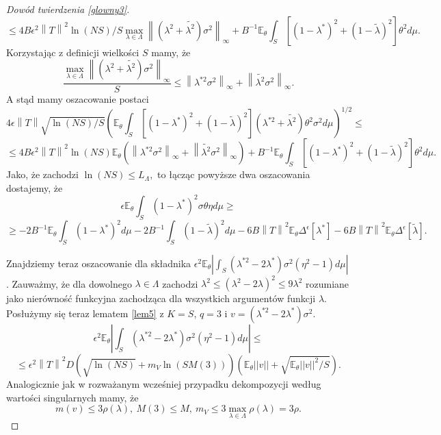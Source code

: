 \documentclass{mwart}
\newcommand{\norm}[1]{\left\lVert#1\right\rVert}
\begin{document}
\begin{proof}[Dowód twierdzenia \ref{glowny3}]
\begin{displaymath}
\leq 4B\epsilon^2\norm{T}^2\ln (NS)/S\max_{\lambda\in \Lambda}\norm{(\lambda^{2}+\tilde{\lambda^2})\sigma^2}_{\infty}+B^{-1}\mathbb{E}_{\theta}\int_S[(1-\lambda^*)^2+(1-\tilde{\lambda})^2]\theta ^2d\mu.
\end{displaymath}
Korzystając z definicji wielkości $S$ mamy, że
\begin{displaymath}
\frac{\max_{\lambda\in \Lambda}\norm{(\lambda^{2}+\tilde{\lambda^2})\sigma^2}_{\infty}}{S}\leq 
\norm{\lambda^{*2}\sigma^2}_{\infty}+\norm{\tilde{\lambda^2}\sigma^2}_{\infty}.
\end{displaymath}
A stąd mamy oszacowanie postaci
\begin{displaymath}
4\epsilon\norm{T}\sqrt{\ln (NS)/S}\left(\mathbb{E}_{\theta}\int_S[(1-\lambda^*)^2+(1-\tilde{\lambda})^2](\lambda^{*2}+\tilde{\lambda^2})\theta ^2\sigma^2 d\mu\right)^{1/2}\leq
\end{displaymath}
\begin{displaymath}
\leq 4B\epsilon^2\norm{T}^2 \ln (NS)\mathbb{E}_{\theta}\left(\norm{\lambda^{*2}\sigma^2}_{\infty}+\norm{\tilde{\lambda^2}\sigma^2}_{\infty}\right)+B^{-1}\mathbb{E}_{\theta}\int_S[(1-\lambda^*)^2+(1-\tilde{\lambda})^2]\theta ^2d\mu.
\end{displaymath}
Jako, że zachodzi 
$\ln (NS)\leq L_{\Lambda},$
to łącząc powyższe dwa oszacowania dostajemy, że 
\begin{displaymath}
\epsilon\mathbb{E}_{\theta}\int_S(1-\lambda^*)^2\sigma\theta \eta d\mu\geq 
\end{displaymath}
\begin{displaymath}
\geq -2B^{-1}\mathbb{E}_{\theta}\int_S(1-\lambda^*)^2d\mu-2B^{-1}\int_S(1-\tilde{\lambda})^2d\mu-6B\norm{T}^2\mathbb{E}_{\theta}\Delta^{\epsilon}[\lambda^*]-6B\norm{T}^2\mathbb{E}_{\theta}\Delta^{\epsilon}[\tilde{\lambda}].
\end{displaymath}

Znajdziemy teraz oszacowanie dla składnika $\epsilon^2\mathbb{E}_{\theta}\left|\int_S(\lambda^{*2}-2\lambda^*)\sigma^2(\eta^2-1)d\mu\right|$. Zauważmy, że  dla dowolnego $\lambda\in \Lambda$ zachodzi $\lambda^2\leq (\lambda^2-2\lambda)^2\leq 9\lambda^2$ rozumiane jako nierówność funkcyjna zachodząca dla wszystkich argumentów funkcji $\lambda$. Posłużymy się teraz lematem \ref{lem5} z $K=S$, $q=3$ i $v=(\lambda^{*2}-2\lambda^*)\sigma^2$. 
\begin{displaymath}
\epsilon^2\mathbb{E}_{\theta}\left|\int_S(\lambda^{*2}-2\lambda^*)\sigma^2(\eta^2-1)d\mu\right|\leq
\end{displaymath}
\begin{displaymath}
\leq \epsilon^2\norm{T}^2D\left(\sqrt{\ln (NS)}+m_V\ln (SM(3))\right)\left(\mathbb{E}_{\theta}||v||+\sqrt{\mathbb{E}_{\theta}||v||^2/S}\right).
\end{displaymath}
Analogicznie jak w rozważanym wcześniej przypadku dekompozycji według wartości singularnych mamy, że
\begin{displaymath}
m(v)\leq 3\rho (\lambda),\ M(3)\leq M,\ m_V\leq 3\max_{\lambda\in \Lambda}\rho(\lambda)=3\rho.
\end{displaymath}


\end{proof}
\end{document}

